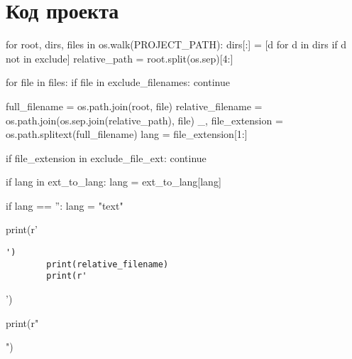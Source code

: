 \section{Код проекта}
\begin{pycode}
for root, dirs, files in os.walk(PROJECT_PATH):
    dirs[:] = [d for d in dirs if d not in exclude]
    relative_path = root.split(os.sep)[4:]

    for file in files:
        if file in exclude_filenames:
                continue

        full_filename = os.path.join(root, file)
        relative_filename = os.path.join(os.sep.join(relative_path), file)
        _, file_extension = os.path.splitext(full_filename)
        lang = file_extension[1:]

        if file_extension in exclude_file_ext:
            continue

        if lang in ext_to_lang:
            lang = ext_to_lang[lang]

        if lang == '':
            lang = "text"

        print(r'\begin{verbatim}')
        print(relative_filename)
        print(r'\end{verbatim}')

        print(r"")
\end{pycode}

\clearpage